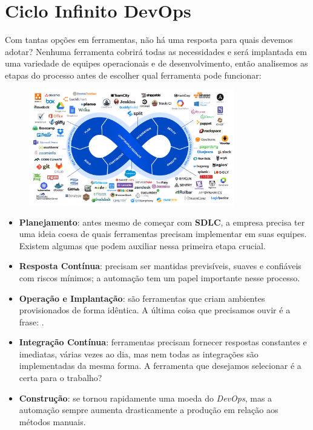 \documentclass[fleqn,10pt]{../sty/SelfArx} %
\begin{document}
\section*{Ciclo Infinito DevOps}
Com tantas opções em ferramentas, não há uma resposta  para quais devemos adotar? Nenhuma ferramenta cobrirá todas as necessidades e será implantada em uma variedade de equipes operacionais e de desenvolvimento, então analisemos as etapas do processo antes de escolher qual ferramenta pode funcionar:
\begin{figure}[H]
	\centering
	\includegraphics[width=0.8\textwidth]{imagens/devops}
\end{figure}

\begin{itemize}
	\item \textbf{Planejamento}: antes mesmo de começar com \textbf{SDLC}, a empresa precisa ter uma ideia coesa de quais ferramentas precisam implementar em suas equipes. Existem algumas que podem auxiliar nessa primeira etapa crucial.
	\item \textbf{Resposta Contínua}: precisam ser mantidas previsíveis, suaves e confiáveis com riscos mínimos; a automação tem um papel importante nesse processo.
	\item \textbf{Operação e Implantação}: são ferramentas que criam ambientes provisionados de forma idêntica. A última coisa que precisamos ouvir é a frase: .
	\item \textbf{Integração Contínua}: ferramentas precisam fornecer respostas constantes e imediatas, várias vezes ao dia, mas nem todas as integrações são implementadas da mesma forma. A ferramenta que desejamos selecionar é a certa para o trabalho?
	\item \textbf{Construção}: se tornou rapidamente uma moeda do \textit{DevOps}, mas a automação sempre aumenta drasticamente a produção em relação aos métodos manuais.
\end{itemize}
\end{document}
